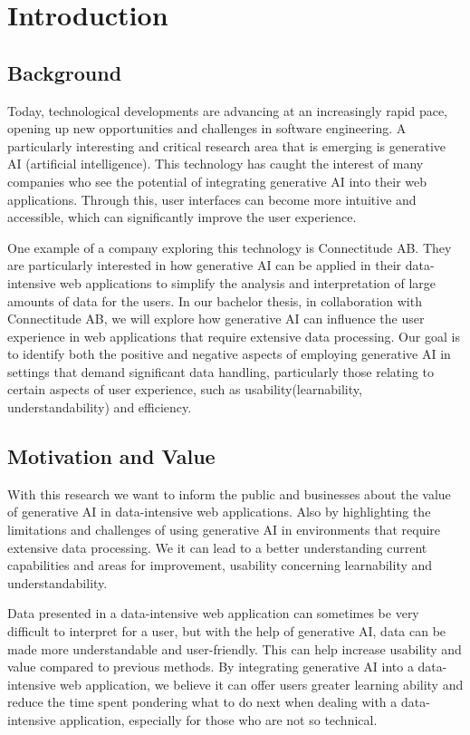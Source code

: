 \chapter{Introduction}
\label{chp:introduction}  %

\section{Background}
Today, technological developments are advancing at an increasingly rapid pace, opening up new opportunities and challenges in software engineering. A particularly interesting and critical research area that is emerging is generative AI (artificial intelligence). This technology has caught the interest of many companies who see the potential of integrating generative AI into their web applications. Through this, user interfaces can become more intuitive and accessible, which can significantly improve the user experience.

One example of a company exploring this technology is Connectitude AB. They are particularly interested in how generative AI can be applied in their data-intensive web applications to simplify the analysis and interpretation of large amounts of data for the users. In our bachelor thesis, in collaboration with Connectitude AB, we will explore how generative AI can influence the user experience in web applications that require extensive data processing. Our goal is to identify both the positive and negative aspects of employing generative AI in settings that demand significant data handling, particularly those relating to certain aspects of user experience, such as usability(learnability, understandability) and efficiency.

\section{Motivation and Value}
With this research we want to inform the public and businesses about the value of generative AI in data-intensive web applications. Also by highlighting the limitations and challenges of using generative AI in environments that require extensive data processing. We it can lead to a better understanding current capabilities and areas for improvement, usability concerning learnability and understandability.

Data presented in a data-intensive web application can sometimes be very difficult to interpret for a user, but with the help of generative AI, data can be made more understandable and user-friendly. This can help increase usability and value compared to previous methods. By integrating generative AI into a data-intensive web application, we believe it can offer users greater learning ability and reduce the time spent pondering what to do next when dealing with a data-intensive application, especially for those who are not so technical.

